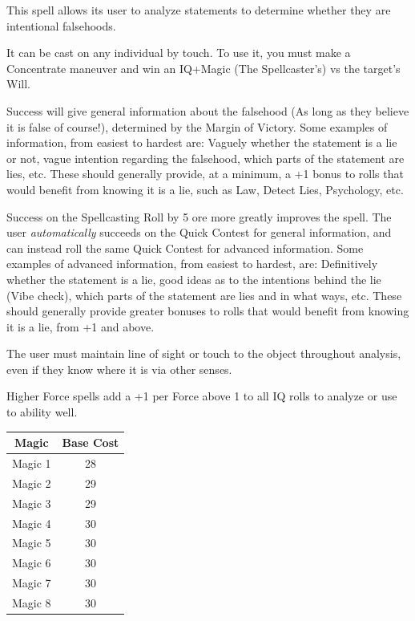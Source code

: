 \begin{multicols*}{3}
	This spell allows its user to analyze statements to determine whether they are intentional falsehoods.
	
	It can be cast on any individual by touch. To use it, you must make a Concentrate maneuver and win an IQ+Magic (The Spellcaster's) vs the target's Will. 
	
	Success will give general information about the falsehood (As long as they believe it is false of course!), determined by the Margin of Victory. Some examples of information, from easiest to hardest are: Vaguely whether the statement is a lie or not, vague intention regarding the falsehood, which parts of the statement are lies, etc. These should generally provide, at a minimum, a +1 bonus to rolls that would benefit from knowing it is a lie, such as Law, Detect Lies, Psychology, etc.
	
	Success on the Spellcasting Roll by 5 ore more greatly improves the spell. The user \textit{automatically} succeeds on the Quick Contest for general information, and can instead roll the same Quick Contest for advanced information. Some examples of advanced information, from easiest to hardest, are: Definitively whether the statement is a lie, good ideas as to the intentions behind the lie (Vibe check), which parts of the statement are lies and in what ways, etc. These should generally provide greater bonuses to rolls that would benefit from knowing it is a lie, from +1 and above.
	
	The user must maintain line of sight or touch to the object throughout analysis, even if they know where it is via other senses.
	
	Higher Force spells add a +1 per Force above 1 to all IQ rolls to analyze or use to ability well.
	
	\begin{center}
		\begin{tabular}{|c|c|}
			\hline
			Magic & Base Cost \\
			\hline
			\hline
			Magic 1 & 28 \\
			Magic 2 & 29 \\
			Magic 3 & 29 \\
			Magic 4 & 30 \\
			Magic 5 & 30 \\
			Magic 6 & 30 \\
			Magic 7 & 30 \\
			Magic 8 & 30 \\
			\hline
		\end{tabular}
	\end{center}
	

\end{multicols*}
